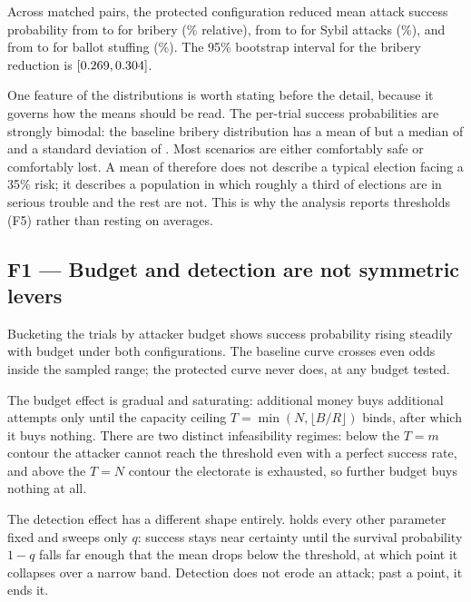 \begin{finding}
Across \TotalTrials{} matched pairs, the protected configuration
reduced mean attack success probability from \BriberyBaseline{} to
\BriberyProtected{} for bribery (\BriberyRelReduction\% relative), from
\SybilBaseline{} to \SybilProtected{} for Sybil attacks
(\SybilRelReduction\%), and from \BallotStuffingBaseline{} to
\BallotStuffingProtected{} for ballot stuffing
(\BallotStuffingRelReduction\%). The 95\% bootstrap interval for the
bribery reduction is $[0.269, 0.304]$.
\end{finding}

One feature of the distributions is worth stating before the detail,
because it governs how the means should be read. The per-trial success
probabilities are strongly bimodal: the baseline bribery distribution
has a mean of \BriberyBaseline{} but a median of
\BriberyBaselineMedian{} and a standard deviation of
\BriberyBaselineStd. Most scenarios are either comfortably safe or
comfortably lost. A mean of \BriberyBaseline{} therefore does not
describe a typical election facing a 35\% risk; it describes a
population in which roughly a third of elections are in serious
trouble and the rest are not. This is why the analysis reports
thresholds (F5) rather than resting on averages.

\subsection{F1 --- Budget and detection are not symmetric levers}
\label{sec:findings-levers}

Bucketing the \TotalTrials{} trials by attacker budget shows success
probability rising steadily with budget under both configurations. The
baseline curve crosses even odds inside the sampled range; the
protected curve never does, at any budget tested.

The budget effect is gradual and saturating: additional money buys
additional attempts only until the capacity ceiling
$T = \min(N, \lfloor B/R \rfloor)$ binds, after which it buys nothing.
There are two distinct infeasibility regimes: below the $T = m$
contour the attacker cannot reach the threshold even with a perfect
success rate, and above the $T = N$ contour the electorate is
exhausted, so further budget buys nothing at all.

The detection effect has a different shape entirely.
 holds every other parameter fixed and sweeps
only $q$: success stays near certainty until the survival probability
$1 - q$ falls far enough that the mean drops below the threshold, at
which point it collapses over a narrow band. Detection does not erode
an attack; past a point, it ends it.

